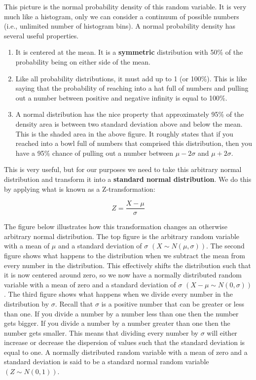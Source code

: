 \documentclass[
]{book}
\begin{document}
This picture is the normal probability density of this random variable. It is very much like a histogram, only we can consider a continuum of possible numbers (i.e., unlimited number of histogram bins). A normal probability density has several useful properties.

\begin{enumerate}
\def\labelenumi{\arabic{enumi}.}
\item
  It is centered at the mean. It is a \textbf{symmetric} distribution with 50\% of the probability being on either side of the mean.
\item
  Like all probability distributions, it must add up to 1 (or 100\%). This is like saying that the probability of reaching into a hat full of numbers and pulling out a number between positive and negative infinity is equal to 100\%.
\item
  A normal distribution has the nice property that approximately 95\% of the density area is between two standard deviation above and below the mean. This is the shaded area in the above figure. It roughly states that if you reached into a bowl full of numbers that comprised this distribution, then you have a 95\% chance of pulling out a number between \(\mu-2\sigma\) and \(\mu+2\sigma\).
\end{enumerate}

This is very useful, but for our purposes we need to take this arbitrary normal distribution and transform it into a \textbf{standard normal distribution}. We do this by applying what is known as a Z-transformation:

\[Z=\frac{X-\mu}{\sigma}\]

The figure below illustrates how this transformation changes an otherwise arbitrary normal distribution. The top figure is the arbitrary random variable with a mean of \(\mu\) and a standard deviation of \(\sigma\) \((X \sim N(\mu,\sigma))\). The second figure shows what happens to the distribution when we subtract the mean from every number in the distribution. This effectively shifts the distribution such that it is now centered around zero, so we now have a normally distributed random variable with a mean of zero and a standard deviation of \(\sigma\) \((X-\mu \sim N(0,\sigma))\). The third figure shows what happens when we divide every number in the distribution by \(\sigma\). Recall that \(\sigma\) is a positive number that can be greater or less than one. If you divide a number by a number less than one then the number gets bigger. If you divide a number by a number greater than one then the number gets smaller. This means that dividing every number by \(\sigma\) will either increase or decrease the dispersion of values such that the standard deviation is equal to one. A normally distributed random variable with a mean of zero and a standard deviation is said to be a standard normal random variable \((Z \sim N(0,1))\).
\end{document}
